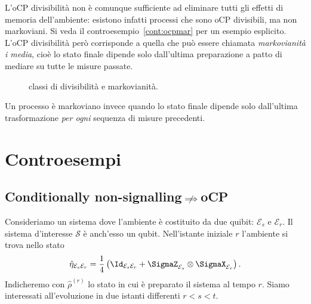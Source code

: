\documentclass[a4]{article}
\begin{document}
L'oCP divisibilità non è comunque sufficiente ad eliminare tutti gli effetti di memoria
dell'ambiente: esistono infatti processi che sono oCP divisibili, ma non markoviani.
Si veda il controesempio~\ref{cont:ocpmar} per un esempio esplicito.
L'oCP divisibilità però corrisponde a quella che può essere chiamata \emph{markovianità
i media}, cioè lo stato finale dipende solo dall'ultima preparazione a patto di mediare
su tutte le misure passate.
\begin{figure}[h!]
	\centering
	\resizebox{0.5\textwidth}{!}{}
	\caption{classi di divisibilità e markovianità.}
\end{figure}


Un processo è markoviano invece quando lo stato finale dipende solo dall'ultima trasformazione
\emph{per ogni} sequenza di misure precedenti.






\section{Controesempi}
\subsection[Cond. non-signalling does not imply oCP]
           {Conditionally non-signalling\(\centernot\implies\)oCP} \label{cont:cnsocp}
Consideriamo un sistema dove l'ambiente è costituito da due quibit: \(\mathcal{E}_s\) e
\(\mathcal{E}_r\). Il sistema d'interesse \(\mathcal{S}\) è anch'esso un qubit.
Nell'istante iniziale \(r\) l'ambiente si trova nello stato
\[\hat{\eta}_{\mathcal{E}_s\mathcal{E}_r} =
  \frac{1}{4}\left(\Id_{\mathcal{E}_s\mathcal{E}_r} +
                    \SigmaZ_{\mathcal{E}_s} \otimes \SigmaX_{\mathcal{E}_r}
             \right). \]
Indicheremo con \(\hat{\rho}^{(r)}\) lo stato in cui è preparato il sistema al tempo \(r\).
Siamo interessati all'evoluzione in due istanti differenti \(r<s<t\).
\end{document}
